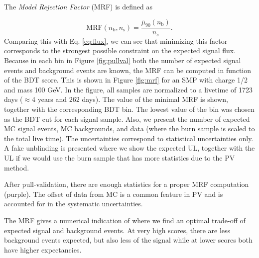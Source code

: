 \noindent The \textit{Model Rejection Factor} (MRF) is defined as 

\begin{equation}
\textrm{MRF}\left(n_\textrm{b}, n_\textrm{s}\right) =  \frac{\overline{\mu}_{90}\left(n_\textrm{b}\right)}{n_s}.
\end{equation}
\noindent Comparing this with Eq. \ref{eq:flux}, we can see that minimizing this factor corresponds to the strongest possible constraint on the expected signal flux. Because in each bin in Figure \ref{fig:pullval} both the number of expected signal events and background events are known, the MRF can be computed in function of the BDT score. This is shown in Figure \ref{fig:mrf} for an SMP with charge 1/2 and mass 100 GeV. In the figure, all samples are normalized to a livetime of 1723 days ($\approx$4 years and 262 days). The value of the minimal MRF is shown, together with the corresponding BDT bin. The lowest value of the bin was chosen as the BDT cut for each signal sample. Also, we present the number of expected MC signal events, MC backgrounds, and data (where the burn sample is scaled to the total live time). The uncertainties correspond to statistical uncertainties only. A fake unblinding is presented where we show the expected UL, together with the UL if we would use the burn sample that has more statistics due to the PV method.

After pull-validation, there are enough statistics for a proper MRF computation (purple). The offset of data from MC is a common feature in PV and is accounted for in the systematic uncertainties.

The MRF gives a numerical indication of where we find an optimal trade-off of expected signal and background events. At very high scores, there are less background events expected, but also less of the signal while at lower scores both have higher expectancies.\\

